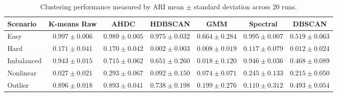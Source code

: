 \documentclass[10pt,twoside]{article}
\numberwithin{equation}{section}
\begin{document}
\begin{table}[ht]

	\centering

	\caption{Clustering performance measured by ARI mean $\pm$ standard deviation across 20 runs.}

	\label{tab:results}

	\scriptsize

	\setlength{\tabcolsep}{2.0pt}

	\begin{tabular}{lcccccc}

		\hline

		\textbf{Scenario} & \textbf{K-means Raw} & \textbf{AHDC} &

		\textbf{HDBSCAN} & \textbf{GMM} & \textbf{Spectral} &

		\textbf{DBSCAN} \\

		\hline

		Easy       & $0.997\pm0.006$ & $0.989\pm0.005$ &

		$0.975\pm0.032$ & $0.664\pm0.284$ & $0.995\pm0.007$ &

		$0.519\pm0.063$ \\



		Hard       & $0.171\pm0.041$ & $0.170\pm0.042$ &

		$0.002\pm0.003$ & $0.008\pm0.019$ & $0.117\pm0.079$ &

		$0.012\pm0.024$ \\



		Imbalanced & $0.943\pm0.015$ & $0.715\pm0.062$ &

		$0.651\pm0.260$ & $0.018\pm0.120$ & $0.946\pm0.036$ &

		$0.468\pm0.089$ \\



		Nonlinear  & $0.027\pm0.021$ & $0.293\pm0.067$ &

		$0.092\pm0.150$ & $0.074\pm0.071$ & $0.245\pm0.133$ &

		$0.215\pm0.050$ \\



		Outlier    & $0.896\pm0.018$ & $0.893\pm0.041$ &

		$0.738\pm0.198$ & $0.199\pm0.276$ & $0.110\pm0.312$ &

		$0.493\pm0.054$ \\

		\hline

	\end{tabular}

\end{table}
\end{document}
